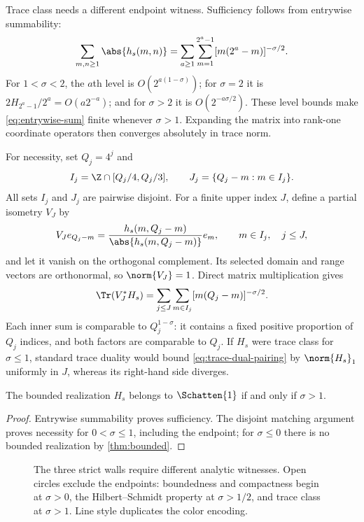 Trace class needs a different endpoint witness.  Sufficiency follows from
entrywise summability:
\begin{equation}
  \sum_{m,n\ge1}\abs{h_s(m,n)}
  =\sum_{a\ge1}\sum_{m=1}^{2^a-1}
    [m(2^a-m)]^{-\sigma/2}.
  \label{eq:entrywise-sum}
\end{equation}
For $1<\sigma<2$, the $a$th level is
$O(2^{a(1-\sigma)})$; for $\sigma=2$ it is
$2H_{2^a-1}/2^a=O(a2^{-a})$; and for $\sigma>2$ it is
$O(2^{-a\sigma/2})$.  These level bounds make
\cref{eq:entrywise-sum} finite whenever
$\sigma>1$.  Expanding the matrix into rank-one coordinate operators then
converges absolutely in trace norm.

For necessity, set $Q_j=4^j$ and
\begin{equation}
  I_j=\Z\cap[Q_j/4,Q_j/3],
  \qquad
  J_j=\{Q_j-m:m\in I_j\}.
  \label{eq:matching-sets}
\end{equation}
All sets $I_j$ and $J_j$ are pairwise disjoint.  For a finite upper index
$J$, define a partial isometry $V_J$ by
\[
  V_J e_{Q_j-m}
  =\frac{h_s(m,Q_j-m)}{\abs{h_s(m,Q_j-m)}}e_m,
  \qquad m\in I_j,\quad j\le J,
\]
and let it vanish on the orthogonal complement.  Its selected domain and
range vectors are orthonormal, so $\norm{V_J}=1$.  Direct matrix
multiplication gives
\begin{equation}
  \Tr(V_J^*H_s)
  =\sum_{j\le J}\sum_{m\in I_j}
    [m(Q_j-m)]^{-\sigma/2}.
  \label{eq:trace-dual-pairing}
\end{equation}
Each inner sum is comparable to $Q_j^{1-\sigma}$: it contains a fixed
positive proportion of $Q_j$ indices, and both factors are comparable to
$Q_j$.  If $H_s$ were trace class for $\sigma\le1$, standard trace duality
\citep{simon2005trace} would bound \cref{eq:trace-dual-pairing} by
$\norm{H_s}_1$ uniformly in $J$,
whereas its right-hand side diverges.

\begin{theorem}
\label{thm:trace-class}
The bounded realization $H_s$ belongs to $\Schatten{1}$ if and only if
$\sigma>1$.
\end{theorem}

\begin{proof}
Entrywise summability proves sufficiency.  The disjoint matching argument
proves necessity for $0<\sigma\le1$, including the endpoint; for
$\sigma\le0$ there is no bounded realization by \cref{thm:bounded}.
\end{proof}

\begin{figure}[t]
  \centering
  \resizebox{0.93\textwidth}{!}{}
  \caption{The three strict walls require different analytic witnesses.
  Open circles exclude the endpoints: boundedness and compactness begin at
  $\sigma>0$, the Hilbert--Schmidt property at $\sigma>1/2$, and trace class
  at $\sigma>1$.  Line style duplicates the color encoding.}
  \label{fig:phase-diagram-main}
\end{figure}

\begin{table}[t]
  \centering
  \caption{Exact operator-ideal and determinant domains.  Every endpoint is
  rejected analytically rather than by finite-cutoff extrapolation.}
  \label{tab:phase-domains-main}
  \small
  
\end{table}

